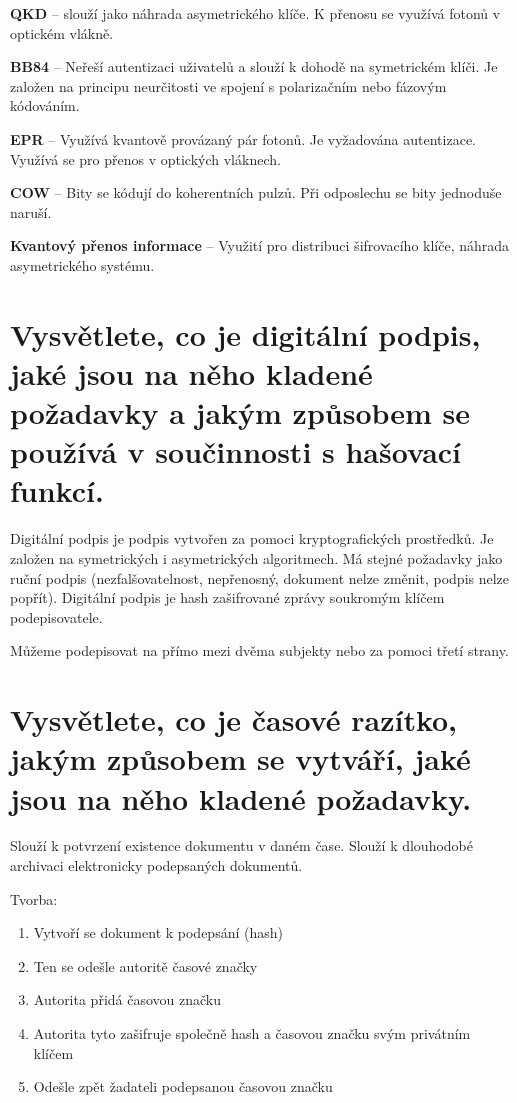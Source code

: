 \textbf{QKD} -- slouží jako náhrada asymetrického klíče. K přenosu se využívá fotonů v optickém vlákně.

\textbf{BB84} -- Neřeší autentizaci uživatelů a slouží k dohodě na symetrickém klíči. Je založen na principu neurčitosti ve spojení s polarizačním nebo fázovým kódováním.

\textbf{EPR} -- Využívá kvantově provázaný pár fotonů. Je vyžadována autentizace. Využívá se pro přenos v optických vláknech.

\textbf{COW} -- Bity se kódují do koherentních pulzů. Při odposlechu se bity jednoduše naruší.

\textbf{Kvantový přenos informace} --  Využití pro distribuci šifrovacího klíče, náhrada asymetrického systému.
 
\section{Vysvětlete, co je digitální podpis, jaké jsou na něho kladené požadavky a jakým způsobem se používá v součinnosti s hašovací funkcí.}

Digitální podpis je podpis vytvořen za pomoci kryptografických prostředků. Je založen na symetrických i asymetrických algoritmech. Má stejné požadavky jako ruční podpis (nezfalšovatelnost, nepřenosný, dokument nelze změnit, podpis nelze popřít). Digitální podpis je hash zašifrované zprávy soukromým klíčem podepisovatele. 

Můžeme podepisovat na přímo mezi dvěma subjekty nebo za pomoci třetí strany. 

\section{Vysvětlete, co je časové razítko, jakým způsobem se vytváří, jaké jsou na něho kladené požadavky.}

Slouží k potvrzení existence dokumentu v daném čase. Slouží k dlouhodobé archivaci elektronicky podepsaných dokumentů. 

Tvorba:
\begin{enumerate}
    \item Vytvoří se dokument k podepsání (hash)
    \item Ten se odešle autoritě časové značky
    \item Autorita přidá časovou značku
    \item Autorita tyto zašifruje společně hash a časovou značku svým privátním klíčem
    \item Odešle zpět žadateli podepsanou časovou značku
\end{enumerate}

